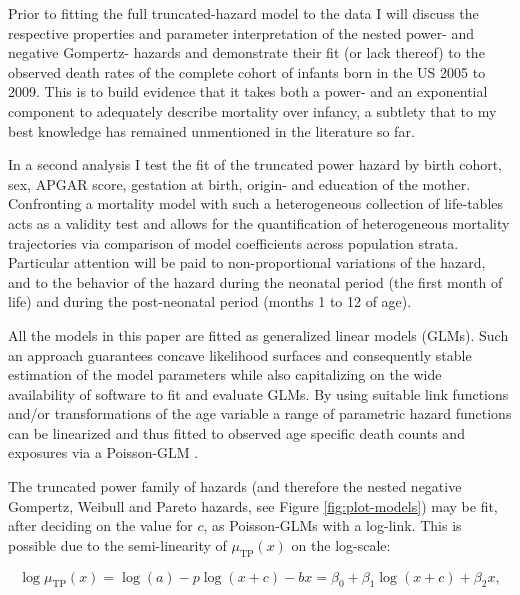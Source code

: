 \documentclass[10pt, twoside, parskip=half]{article}
\begin{document}
Prior to fitting the full truncated-hazard model to the data I will
discuss the respective properties and parameter interpretation of the
nested power- and negative Gompertz- hazards and demonstrate their fit
(or lack thereof) to the observed death rates of the complete cohort of
infants born in the US 2005 to 2009. This is to build evidence that it
takes both a power- and an exponential component to adequately describe
mortality over infancy, a subtlety that to my best knowledge has
remained unmentioned in the literature so far.

In a second analysis I test the fit of the truncated power hazard by
birth cohort, sex, APGAR score, gestation at birth, origin- and
education of the mother. Confronting a mortality model with such a
heterogeneous collection of life-tables acts as a validity test and
allows for the quantification of heterogeneous mortality trajectories
via comparison of model coefficients across population strata.
Particular attention will be paid to non-proportional variations of the
hazard, and to the behavior of the hazard during the neonatal period
(the first month of life) and during the post-neonatal period (months 1
to 12 of age).

All the models in this paper are fitted as generalized linear models
(GLMs). Such an approach guarantees concave likelihood surfaces and
consequently stable estimation of the model parameters while also
capitalizing on the wide availability of software to fit and evaluate
GLMs. By using suitable link functions and/or transformations of the age
variable a range of parametric hazard functions can be linearized and
thus fitted to observed age specific death counts and exposures via a
Poisson-GLM \citep{Aitkin1980, Clayton1983, Currie2016}.

The truncated power family of hazards (and therefore the nested negative
Gompertz, Weibull and Pareto hazards, see Figure \ref{fig:plot-models})
may be fit, after deciding on the value for \(c\), as Poisson-GLMs with
a log-link. This is possible due to the semi-linearity of
\(\mu_\text{TP}(x)\) on the log-scale:

\[
\log \mu_\text{TP}(x) = \log(a)-p\log(x+c)-bx = \beta_0+\beta_1\log(x+c)+\beta_2x,
\]
\end{document}

